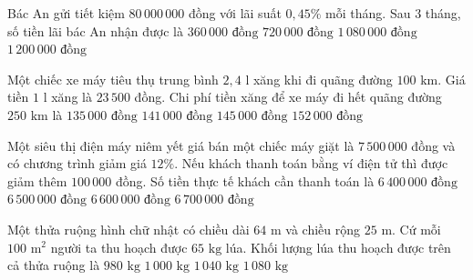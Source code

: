 \begin{ex} %
Bác An gửi tiết kiệm $80\,000\,000$ đồng với lãi suất $0{,}45\%$ mỗi tháng. Sau $3$ tháng, số tiền lãi bác An nhận được là
\choice
{$360\,000\text{ đồng}$}
{$720\,000\text{ đồng}$}
{\True $1\,080\,000\text{ đồng}$}
{$1\,200\,000\text{ đồng}$}
\end{ex}

\begin{ex} %
Một chiếc xe máy tiêu thụ trung bình $2{,}4\text{ l}$ xăng khi đi quãng đường $100\text{ km}$. Giá tiền $1\text{ l}$ xăng là $23\,500$ đồng. Chi phí tiền xăng để xe máy đi hết quãng đường $250\text{ km}$ là
\choice
{$135\,000\text{ đồng}$}
{\True $141\,000\text{ đồng}$}
{$145\,000\text{ đồng}$}
{$152\,000\text{ đồng}$}
\end{ex}

\begin{ex} %
Một siêu thị điện máy niêm yết giá bán một chiếc máy giặt là $7\,500\,000$ đồng và có chương trình giảm giá $12\%$. Nếu khách thanh toán bằng ví điện tử thì được giảm thêm $100\,000$ đồng. Số tiền thực tế khách cần thanh toán là
\choice
{$6\,400\,000\text{ đồng}$}
{\True $6\,500\,000\text{ đồng}$}
{$6\,600\,000\text{ đồng}$}
{$6\,700\,000\text{ đồng}$}
\end{ex}

\begin{ex} %
Một thửa ruộng hình chữ nhật có chiều dài $64\text{ m}$ và chiều rộng $25\text{ m}$. Cứ mỗi $100\text{ m}^2$ người ta thu hoạch được $65\text{ kg}$ lúa. Khối lượng lúa thu hoạch được trên cả thửa ruộng là
\choice
{$980\text{ kg}$}
{$1\,000\text{ kg}$}
{\True $1\,040\text{ kg}$}
{$1\,080\text{ kg}$}
\end{ex}

